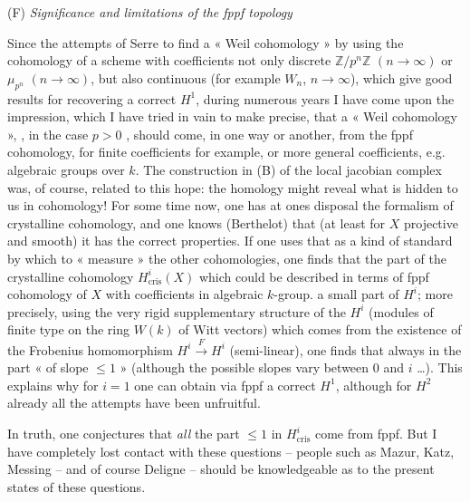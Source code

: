 \documentclass[11pt,a4paper]{article}
\begin{document}

(F) \emph{Significance and limitations of the fppf topology}

Since the attempts of Serre to find a « Weil cohomology » by using the cohomology of a scheme with coefficients not only discrete $\mathbb{Z}/p^n\mathbb{Z}$ $(n \to \infty)$ or $\mu_{p^n}$ $(n \to \infty)$, but also continuous (for example $W_n$, $n \to \infty$), which give good results for recovering a correct $H^1$, during numerous years I have come upon the impression, which I have tried in vain to make precise, that a  « Weil cohomology », , in the case $p > 0$ , should come, in one way or another, from the fppf cohomology, for finite coefficients for example, or more general coefficients, e.g. algebraic groups over $k$. The construction in (B) of the local jacobian complex was, of course, related to this hope: the homology might reveal what is hidden to us in cohomology! For some time now, one has at ones disposal the formalism of crystalline cohomology, and one knows (Berthelot) that (at least for $X$ projective and smooth) it has the correct properties. If one uses that as a kind of standard by which to « measure » the other cohomologies, one finds that the part of the crystalline cohomology $H^i_{\mathrm{cris}}(X)$ which could be described in terms of fppf cohomology of $X$ with coefficients in  algebraic $k$-group.    a small part of $H^i$; more precisely, using the very rigid supplementary structure of the $H^i$ (modules of finite type on the ring $W(k)$ of Witt vectors) which comes from the existence of the Frobenius homomorphism  $H^i \xrightarrow{F} H^i$ (semi-linear), one finds that   always in the part « of slope $\leqslant 1$ » (although the possible slopes vary between $0$ and $i$ …). This explains why for $i = 1$ one can obtain via fppf a correct $H^1$, although for $H^2$ already all the attempts have been unfruitful.

In truth, one conjectures that \emph{all} the part   $\leqslant 1$ in $H^i_{\mathrm{cris}}$ come from fppf. But I have completely lost contact with these questions -- people such as Mazur, Katz, Messing -- and of course Deligne -- should be knowledgeable as to the present states of these questions.
\end{document}
